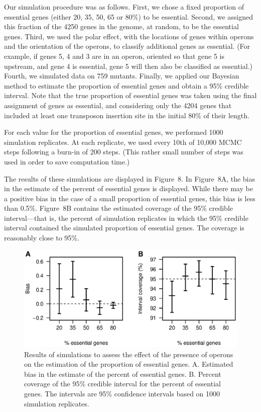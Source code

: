 \documentclass[letterpaper]{article}
\begin{document}
\begin{multicols}{2}
Our simulation procedure was as follows.  First, we chose a fixed
proportion of essential genes (either 20, 35, 50, 65 or 80\%) to be
essential.  Second, we assigned this fraction of the 4250 genes in the
genome, at random, to be the essential genes.  Third, we used the
polar effect, with the locations of genes within operons and the
orientation of the operons, to classify additional genes as essential.
(For example, if genes 5, 4 and 3 are in an operon, oriented so that
gene 5 is upstream, and gene 4 is essential, gene 5 will then also be
classified as essential.)  Fourth, we simulated data on 759
mutants.  Finally, we applied our Bayesian method to estimate the
proportion of essential genes and obtain a 95\% credible interval.
Note that the true proportion of essential genes was taken using the
final assignment of genes as essential, and considering only the 4204
genes that included at least one transposon insertion site in the
initial 80\% of their length.

For each value for the proportion of essential genes, we
performed 1000 simulation replicates.  At each replicate, we used
every 10th of 10,000 MCMC steps following a burn-in of 200 steps.
(This rather small number of steps was used in order to save
computation time.)  

The results of these simulations are displayed in Figure~8.  In
Figure~8A, the bias in the estimate of the percent of essential genes
is displayed.  While there may be a positive bias in the case of a
small proportion of essential genes, this bias is less than 0.5\%.
Figure~8B contains the estimated coverage of the 95\% credible
interval---that is, the percent of simulation replicates in which the
95\% credible interval contained the simulated proportion of essential
genes.  The coverage is reasonably close to 95\%.

\begin{figure}
\begin{center}
\includegraphics{Figs/fig8.ps}
\caption{Results of simulations to assess the effect of the presence
of operons on the estimation of the proportion of essential genes.
A. Estimated bias in the estimate of the percent of essential genes.
B. Percent coverage of the 95\% credible interval for the percent of
essential genes.  The intervals are 95\% confidence intervals based on
1000 simulation replicates.}
\end{center}
\end{figure}


\end{multicols}
\end{document}
